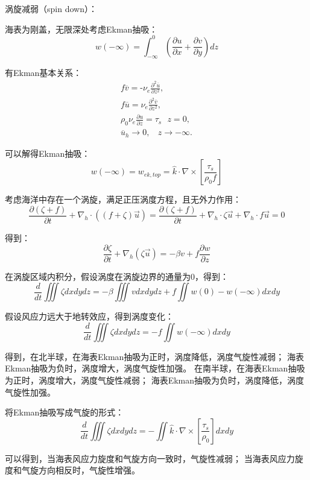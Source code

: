 \documentclass{article}
\begin{document}
涡旋减弱（spin down）：

海表为刚盖，无限深处考虑Ekman抽吸：
$$w(-\infty) = \int_{-\infty}^0(\frac{\partial u}{\partial x} 
+ \frac{\partial v}{\partial y})dz$$

有Ekman基本关系：
\begin{align}
    & f\overline{v}=\text{-}{{\nu }_{e}}\frac{{{\partial }^{2}}\overline{u}}{\partial {{z}^{2}}}, \\ 
   & f\overline{u}={{\nu }_{e}}\frac{{{\partial }^{2}}\overline{v}}{\partial {{z}^{2}}}, \\ 
   & \rho_0\nu_e\frac{\partial u}{\partial z} = \tau_s\ \ \ z=0, \\ 
   & {{\overline{u}}_{h}}\to 0,\ \ \ \ z\to -\infty .\ \ \ \  
\end{align}

可以解得Ekman抽吸：
$$w(-\infty)={{w}_{ek,top}}=\hat{k}\cdot \nabla \times \left[ \frac{{{\tau }_{s}}}{{{\rho }_{0}}f} \right]$$

考虑海洋中存在一个涡旋，满足正压涡度方程，且无外力作用：
$$\frac{\partial(\zeta+f)}{\partial t} + \nabla_h\cdot((f+\zeta)\vec{u})
 = \frac{\partial(\zeta+f)}{\partial t} + \nabla_h\cdot\zeta\vec{u}
 + \nabla_h\cdot f\vec{u}=0$$

得到：
$$\frac{\partial\zeta}{\partial t} + \nabla_h(\zeta\vec{u})
=-\beta v +f\frac{\partial w}{\partial z}$$

在涡旋区域内积分，假设涡度在涡旋边界的通量为0，得到：
$$\frac{d}{dt}\iiint\zeta dxdydz
=-\beta\iiint v dxdydz + f\iint w(0) - w(-\infty) dxdy$$

假设风应力远大于地转效应，得到涡度变化：
$$\frac{d}{dt}\iiint\zeta dxdydz
=- f\iint  w(-\infty) dxdy$$

得到，在北半球，在海表Ekman抽吸为正时，涡度降低，涡度气旋性减弱；
海表Ekman抽吸为负时，涡度增大，涡度气旋性加强。
在南半球，在海表Ekman抽吸为正时，涡度增大，涡度气旋性减弱；
海表Ekman抽吸为负时，涡度降低，涡度气旋性加强。

将Ekman抽吸写成气旋的形式：
$$\frac{d}{dt}\iiint\zeta dxdydz
=-\iint\hat{k}\cdot \nabla \times \left[ \frac{{{\tau }_{s}}}{{{\rho }_{0}}} \right]dxdy$$

可以得到，当海表风应力旋度和气旋方向一致时，气旋性减弱；
当海表风应力旋度和气旋方向相反时，气旋性增强。
\end{document}
